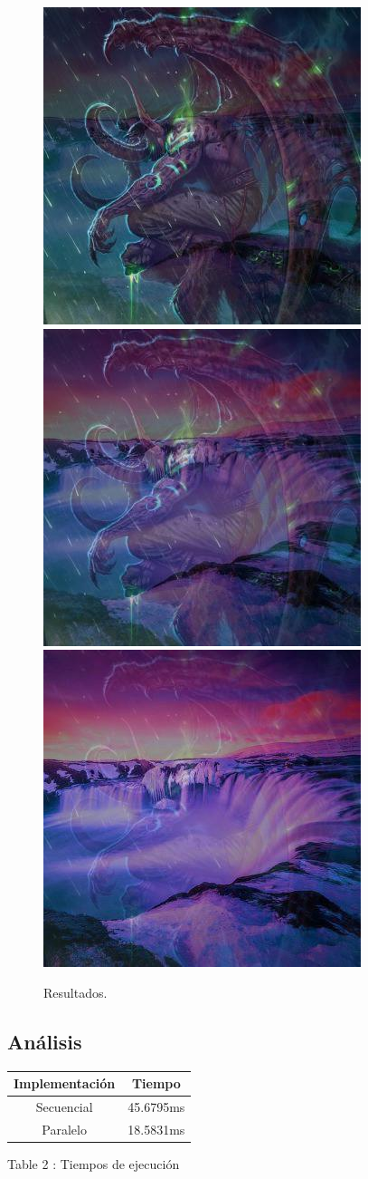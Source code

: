 \documentclass[https://www.overleaf.com/project/63761df255a8a9f4a15c3579
	letterpaper, %
	10pt, %
]{CSUniSchoolLabReport}
\begin{document}
\begin{figure}[H]
    \centering 
    \includegraphics[width=.3\textwidth]{images/resultParallel2_25.jpg}
    \includegraphics[width=.3\textwidth]{images/resultParallel2_50.jpg}
    \includegraphics[width=.3\textwidth]{images/resultParallel2_75.jpg}
    \caption{Resultados.}
    \label{fig}
\end{figure}
\subsection*{Análisis}
\begin{center}
    \begin{tabular}{| c | c |}
        \hline
            Implementación & Tiempo 
             \\ 
        \hline
            Secuencial & 45.6795ms
            \\
            Paralelo & 18.5831ms
            \\
        \hline
    \end{tabular}
\end{center}
 \begin{center}
    Table 2 : Tiempos de ejecución
 \end{center}
\end{document}
